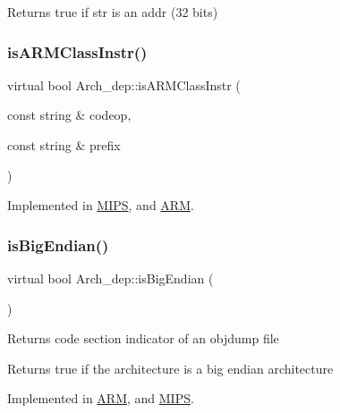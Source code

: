 Returns true if str is an addr (32 bits) \mbox{\label{classArch__dep_a71398abb52e277ead74615af892a2dd8}} 
\subsubsection{\texorpdfstring{is\+A\+R\+M\+Class\+Instr()}{isARMClassInstr()}}
{\footnotesize\ttfamily virtual bool Arch\+\_\+dep\+::is\+A\+R\+M\+Class\+Instr (\begin{DoxyParamCaption}\item[{const string \&}]{codeop,  }\item[{const string \&}]{prefix }\end{DoxyParamCaption})\hspace{0.3cm}{\ttfamily [pure virtual]}}



Implemented in \hyperlink{classMIPS_aa234e9a3a6942ce0a38894fa4caddbd9}{M\+I\+PS}, and \hyperlink{classARM_a76b4f8a8fe1fb702277f5a4f2b9475d2}{A\+RM}.

\mbox{\label{classArch__dep_a2734ff9ad6b2d894a2573eaedcd46989}} 
\subsubsection{\texorpdfstring{is\+Big\+Endian()}{isBigEndian()}}
{\footnotesize\ttfamily virtual bool Arch\+\_\+dep\+::is\+Big\+Endian (\begin{DoxyParamCaption}{ }\end{DoxyParamCaption})\hspace{0.3cm}{\ttfamily [pure virtual]}}

Returns code section indicator of an objdump file

Returns true if the architecture is a big endian architecture 

Implemented in \hyperlink{classARM_ae86effb7574c3627cd114ec35e5bd096}{A\+RM}, and \hyperlink{classMIPS_ae645fa32988ae74ef68ee141ee88a434}{M\+I\+PS}.

\mbox{\label{classArch__dep_a0e7d21d956903e11000d78cab233c24d}} 
